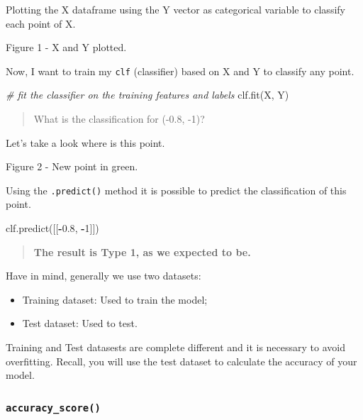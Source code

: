 \documentclass[]{book}
\newenvironment{Shaded}{\begin{snugshade}}{\end{snugshade}}
\newcommand{\DecValTok}[1]{\textcolor[rgb]{0.00,0.00,0.81}{#1}}
\newcommand{\FloatTok}[1]{\textcolor[rgb]{0.00,0.00,0.81}{#1}}
\newcommand{\CommentTok}[1]{\textcolor[rgb]{0.56,0.35,0.01}{\textit{#1}}}
\newcommand{\OperatorTok}[1]{\textcolor[rgb]{0.81,0.36,0.00}{\textbf{#1}}}
\newcommand{\NormalTok}[1]{#1}
\providecommand{\tightlist}{%
  \setlength{\itemsep}{0pt}\setlength{\parskip}{0pt}}
\begin{document}
Plotting the X dataframe using the Y vector as categorical variable to
classify each point of X.

Figure 1 - X and Y plotted.

Now, I want to train my \texttt{clf} (classifier) based on X and Y to
classify any point.

\begin{Shaded}
\begin{Highlighting}[]
\CommentTok{# fit the classifier on the training features and labels}
\NormalTok{clf.fit(X, Y)}
\end{Highlighting}
\end{Shaded}

\begin{quote}
What is the classification for (-0.8, -1)?
\end{quote}

Let's take a look where is this point.

Figure 2 - New point in green.

Using the \texttt{.predict()} method it is possible to predict the
classification of this point.

\begin{Shaded}
\begin{Highlighting}[]
\NormalTok{clf.predict([[}\OperatorTok{-}\FloatTok{0.8}\NormalTok{, }\OperatorTok{-}\DecValTok{1}\NormalTok{]])}
\end{Highlighting}
\end{Shaded}

\begin{quote}
\textbf{The result is Type 1, as we expected to be.}
\end{quote}

Have in mind, generally we use two datasets:

\begin{itemize}
\tightlist
\item
  Training dataset: Used to train the model;
\item
  Test dataset: Used to test.
\end{itemize}

Training and Test datasests are complete different and it is necessary
to avoid overfitting. Recall, you will use the test dataset to calculate
the accuracy of your model.

\subsubsection{\texorpdfstring{\texttt{accuracy\_score()}}{accuracy\_score()}}\label{accuracy_score}
\end{document}
